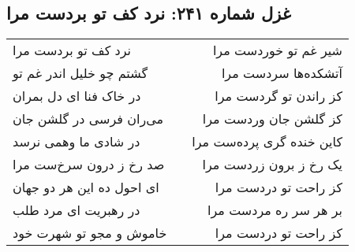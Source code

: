 \begin{center}
\section*{غزل شماره ۲۴۱: نرد کف تو بردست مرا}
\label{sec:0241}
\begin{longtable}{l p{0.5cm} r}
نرد کف تو بردست مرا
&&
شیر غم تو خوردست مرا
\\
گشتم چو خلیل اندر غم تو
&&
آتشکده‌ها سردست مرا
\\
در خاک فنا ای دل بمران
&&
کز راندن تو گردست مرا
\\
می‌ران فرسی در گلشن جان
&&
کز گلشن جان وردست مرا
\\
در شادی ما وهمی نرسد
&&
کاین خنده گری پرده‌ست مرا
\\
صد رخ ز درون سرخ‌ست مرا
&&
یک رخ ز برون زردست مرا
\\
ای احول ده این هر دو جهان
&&
کز راحت تو دردست مرا
\\
در رهبریت ای مرد طلب
&&
بر هر سر ره مردست مرا
\\
خاموش و مجو تو شهرت خود
&&
کز راحت تو دردست مرا
\\
\end{longtable}
\end{center}
